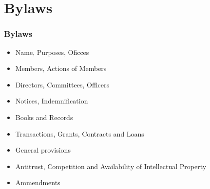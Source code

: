 \section{Bylaws}

\begin{frame}
\frametitle{Bylaws}

\begin{itemize}
  \item Name, Purposes, Oficces
  \item Members, Actions of Members
  \item Directors, Committees, Officers
  \item Notices, Indemnification
  \item Books and Records
  \item Transactions, Grants, Contracts and Loans
  \item General provisions
  \item Antitrust, Competition and Availability of Intellectual Property
  \item Ammendments
\end{itemize}

\end{frame}

